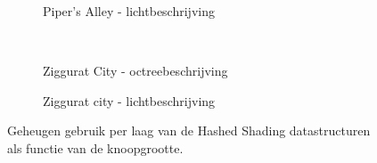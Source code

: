 \begin{figure}[t]
\begin{adjustbox}{minipage=\textwidth, scale=0.55}
\begin{subfigure}[b]{0.8\textwidth}
    \end{subfigure}
  \end{adjustbox}
  \begin{adjustbox}{minipage=\textwidth, scale=0.55}
    \begin{subfigure}[b]{0.8\textwidth}
      \centering
      \def\svgwidth{\textwidth}
      
      \caption{Piper's Alley - lichtbeschrijving}
      \label{fig:hs-layered-mem:alley-data}
    \end{subfigure}
  \end{adjustbox} \\
  \begin{adjustbox}{minipage=\textwidth, scale=0.55}
    \begin{subfigure}[b]{0.8\textwidth}
      \centering
      \def\svgwidth{\textwidth}
      
      \caption{Ziggurat City - octreebeschrijving}
      \label{fig:hs-layered-mem:city-octree}
    \end{subfigure}
  \end{adjustbox} %
  \begin{adjustbox}{minipage=\textwidth, scale=0.55}
    \begin{subfigure}[b]{0.8\textwidth}
      \centering
      \def\svgwidth{\textwidth}
      
      \caption{Ziggurat city - lichtbeschrijving}
      \label{fig:hs-layered-mem:city-data}
    \end{subfigure}
  \end{adjustbox}
  \caption{\small Geheugen gebruik per laag van de Hashed Shading datastructuren als functie van de knoopgrootte.}
  \label{fig:hs-layered-mem}
\end{figure}

